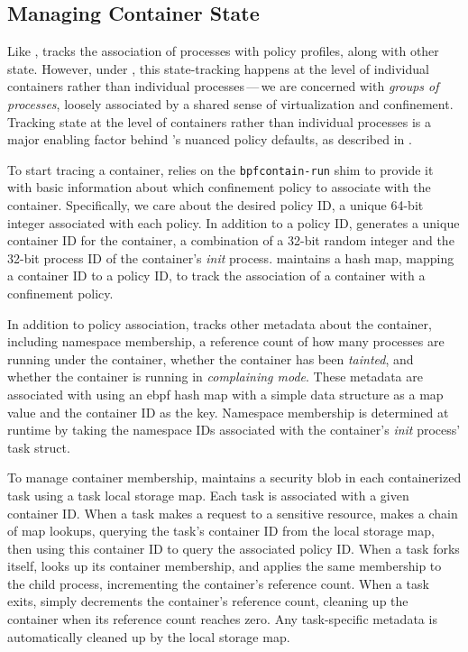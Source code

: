 \subsection{Managing Container State}%
\label{ss:bpfcontain-state}

Like \bpfbox{}, \bpfcontain{} tracks the association of processes with policy profiles,
along with other state. However, under \bpfcontain{}, this state-tracking happens
at the level of individual containers rather than individual processes\,---\,we are
concerned with \textit{groups of processes}, loosely associated by a shared sense of
virtualization and confinement. Tracking state at the level of containers rather than
individual processes is a major enabling factor behind \bpfcontain{}'s nuanced policy
defaults, as described in .

To start tracing a container, \bpfcontain{} relies on the \texttt{bpfcontain-run} shim to
provide it with basic information about which confinement policy to associate with the
container. Specifically, we care about the desired policy ID, a unique 64-bit integer
associated with each \bpfcontain{} policy. In addition to a policy ID, \bpfcontain{}
generates a unique container ID for the container, a combination of a 32-bit random
integer and the 32-bit process ID of the container's \textit{init} process. \bpfcontain{}
maintains a hash map, mapping a container ID to a policy ID, to track the association of
a container with a confinement policy.

In addition to policy association, \bpfcontain{} tracks other metadata about the
container, including namespace membership, a reference count of how many processes are
running under the container, whether the container has been \textit{tainted}, and whether
the container is running in \textit{complaining mode}. These metadata are associated with
using an \gls{ebpf} hash map with a simple data structure as a map value and the container
ID as the key. Namespace membership is determined at runtime by taking the namespace IDs
associated with the container's \textit{init} process' task struct.

To manage container membership, \bpfcontain{} maintains a security blob in each
containerized task using a task local storage map. Each task is associated with a given
container ID. When a task makes a request to a sensitive resource, \bpfcontain{} makes
a chain of map lookups, querying the task's container ID from the local storage map, then
using this container ID to query the associated policy ID. When a task forks itself,
\bpfcontain{} looks up its container membership, and applies the same membership to the
child process, incrementing the container's reference count. When a task exits,
\bpfcontain{} simply decrements the container's reference count, cleaning up the container
when its reference count reaches zero. Any task-specific metadata is automatically cleaned
up by the local storage map.

